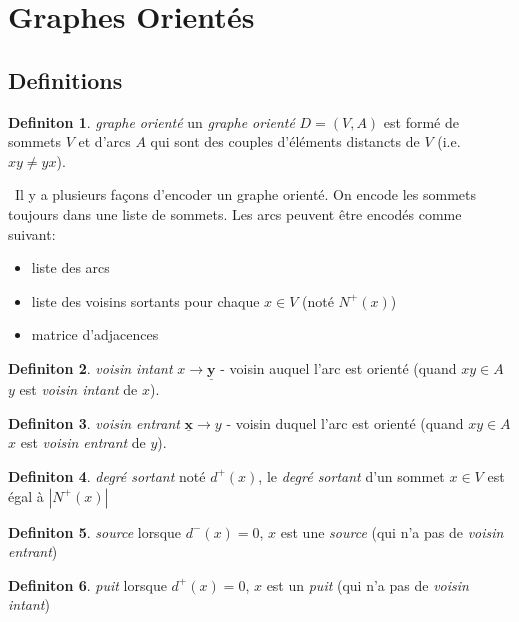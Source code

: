 \documentclass[french]{article}
\theoremstyle{definition}
\newtheorem{definition}{Definiton}[subsection]
\begin{document}
		\section{Graphes Orientés}
		\subsection{Definitions}
		\begin{definition}{\textit{graphe orienté}}
			un \textit{graphe orienté} $D = (V, A)$ est formé de sommets $V$ et d'arcs $A$ qui sont des couples d'éléments distancts de $V$ (i.e. $xy \neq yx$).
		\end{definition}
		\
		Il y a plusieurs façons d'encoder un graphe orienté. On encode les sommets toujours dans une liste de sommets. Les arcs peuvent être encodés comme suivant:
		\begin{itemize}
			\item liste des arcs
			\item liste des voisins sortants pour chaque $x \in V$ (noté $N^+(x)$)
			\item matrice d'adjacences
		\end{itemize}
		\begin{definition}{\textit{voisin intant}}
			$x \to \mathbf{\underline{y}}$ - voisin auquel l'arc est orienté (quand $xy \in A$ $y$ est \textit{voisin intant} de $x$).
		\end{definition}
		
		\begin{definition}{\textit{voisin entrant}}
			$\mathbf{\underline{x}} \to y$ - voisin duquel l'arc est orienté (quand $xy \in A$ $x$ est \textit{voisin entrant} de $y$).
		\end{definition}
		
		\begin{definition}{\textit{degré sortant}}
			noté $d^+(x)$, le \textit{degré sortant} d'un sommet $x \in V$ est égal à $|N^+(x)|$
		\end{definition}
		
		\begin{definition}{\textit{source}}
			lorsque $d^-(x) = 0$, $x$ est une \textit{source} (qui n'a pas de \textit{voisin entrant})
		\end{definition}
		
		\begin{definition}{\textit{puit}}
			lorsque $d^+(x) = 0$, $x$ est un \textit{puit} (qui n'a pas de \textit{voisin intant})
		\end{definition}
\end{document}
